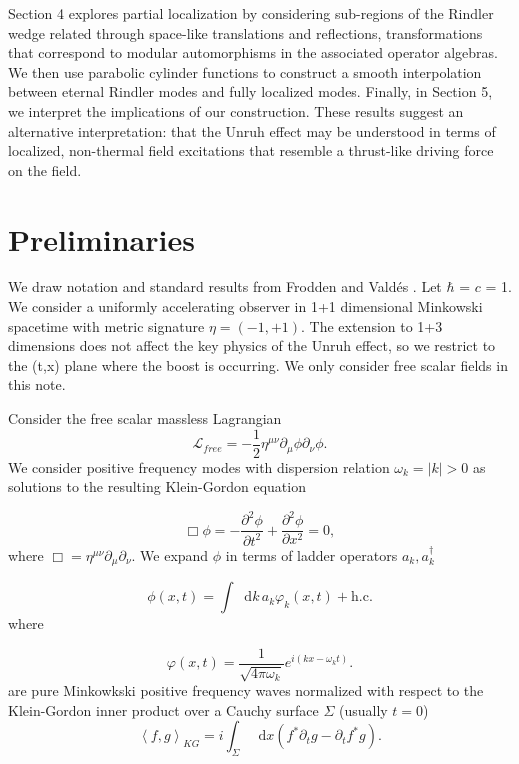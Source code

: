\documentclass[12pt,a4paper]{article}
\newcommand*\diff{\mathop{}\!\mathrm{d}}
\begin{document}
Section 4 explores partial localization by considering sub-regions of the Rindler wedge related through space-like translations and reflections, transformations that correspond to modular automorphisms in the associated operator algebras. We then use parabolic cylinder functions to construct a smooth interpolation between eternal Rindler modes and fully localized modes. Finally, in Section 5, we interpret the implications of our construction. These results suggest an alternative interpretation: that the Unruh effect may be understood in terms of localized, non-thermal field excitations that resemble a thrust-like driving force on the field.

\section{Preliminaries}

We draw notation and standard results from Frodden and Vald{\'{e}}s \cite{frodden2018unruh}. Let $\hbar$ = $c$ = 1. We consider a uniformly accelerating observer in 1+1 dimensional Minkowski spacetime with metric signature $\eta=(-1,+1)$. The extension to 1+3 dimensions does not affect the key physics of the Unruh effect, so we restrict to the (t,x) plane where the boost is occurring.  We only consider free scalar fields in this note.

Consider the free scalar massless Lagrangian
\begin{equation}
\mathscr{L}_{free} = -\frac{1}{2} \eta^{\mu\nu}\partial_\mu \phi \partial_\nu \phi.
\end{equation}
We consider positive frequency modes with dispersion relation $\omega_k = |k| > 0$ as solutions to the resulting Klein-Gordon equation 

\begin{equation}
  \Box \phi = -\frac{\partial^2 \phi}{\partial t^2} + \frac{\partial^2 \phi}{\partial x^2} = 0,
 \label{massless-wave-eq}
\end{equation}
where $\Box = \eta^{\mu\nu} \partial_\mu \partial_\nu$. We expand $\phi$ in terms of ladder operators $a_k, a_k^\dagger$

\begin{equation}
  \phi(x,t) = \int \diff k \, a_k \varphi_k(x,t) + \text{h.c.}
\end{equation}
where

\begin{equation}
  \varphi(x,t) = \frac{1}{\sqrt{4\pi\omega_k}} e^{i(kx - \omega_k t)}.
\label{amode}
\end{equation}
are pure Minkowkski positive frequency waves normalized with respect to the Klein-Gordon inner product over a Cauchy surface $\Sigma$ (usually $t = 0$)
\begin{equation}
  \left<f, g\right>_{KG} = i \int_\Sigma \diff x (f^* \partial_t g - \partial_t f^* g).
\end{equation}
\end{document}

